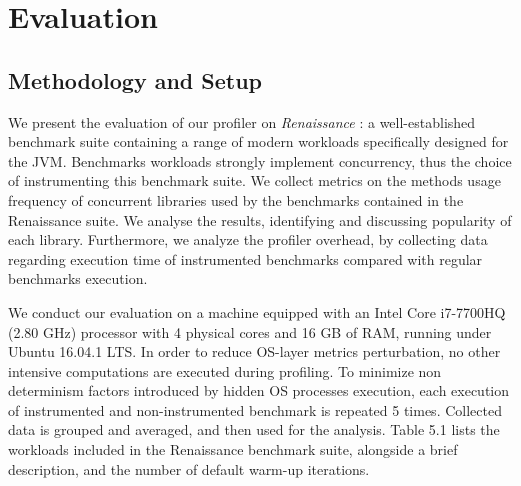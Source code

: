 \documentclass[]{usiinfthesis}
\begin{document}
\chapter{Evaluation}


\section{Methodology and Setup}
\large
We present the evaluation of our profiler on \textit{Renaissance} : a well-established benchmark suite containing a range of modern workloads specifically designed for the JVM. Benchmarks workloads strongly implement concurrency, thus the choice of instrumenting this benchmark suite. We collect metrics on the methods usage frequency of concurrent libraries used by the benchmarks contained in the Renaissance suite. We analyse the results, identifying and discussing popularity of each library. Furthermore, we analyze the profiler overhead, by collecting data regarding execution time of instrumented benchmarks compared with regular benchmarks execution. 

We conduct our evaluation on a machine equipped with an Intel Core i7-7700HQ (2.80 GHz) processor with 4 physical cores and 16 GB of RAM, running under Ubuntu 16.04.1 LTS. In order to reduce OS-layer metrics perturbation, no other intensive computations are executed during profiling. To minimize non determinism factors introduced by hidden OS processes execution, each execution of instrumented and non-instrumented benchmark is repeated 5 times. Collected data is grouped and averaged, and then used for the analysis. Table 5.1 lists the workloads included in the Renaissance benchmark suite, alongside a brief description, and the number of default warm-up iterations. 
\end{document}
